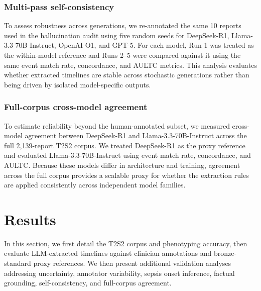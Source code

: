 \documentclass[pmlr,twocolumn,10pt]{jmlr} %
\begin{document}
\subsubsection{Multi-pass self-consistency}
\label{sec:self_consistency_methods}
To assess robustness across generations, we re-annotated the same 10 reports used in the hallucination audit using five random seeds for DeepSeek-R1, Llama-3.3-70B-Instruct, OpenAI O1, and GPT-5.
For each model, Run 1 was treated as the within-model reference and Runs 2--5 were compared against it using the same event match rate, concordance, and AULTC metrics.
This analysis evaluates whether extracted timelines are stable across stochastic generations rather than being driven by isolated model-specific outputs.

\subsubsection{Full-corpus cross-model agreement}
\label{sec:full_corpus_agreement_methods}
To estimate reliability beyond the human-annotated subset, we measured cross-model agreement between DeepSeek-R1 and Llama-3.3-70B-Instruct across the full 2,139-report T2S2 corpus.
We treated DeepSeek-R1 as the proxy reference and evaluated Llama-3.3-70B-Instruct using event match rate, concordance, and AULTC.
Because these models differ in architecture and training, agreement across the full corpus provides a scalable proxy for whether the extraction rules are applied consistently across independent model families.


\vspace{-1em}

\section{Results}
\vspace{-.5em}
In this section, we first detail the T2S2 corpus and phenotyping accuracy, then evaluate LLM-extracted timelines against clinician annotations and bronze-standard proxy references.
We then present additional validation analyses addressing uncertainty, annotator variability, sepsis onset inference, factual grounding, self-consistency, and full-corpus agreement.

\vspace{-.75em}
\end{document}

